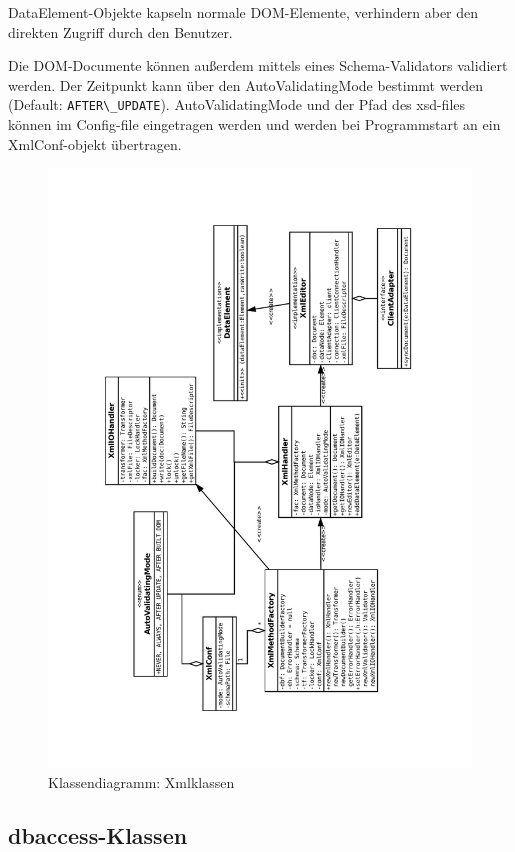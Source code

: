 DataElement-Objekte kapseln normale DOM-Elemente, verhindern aber den 
direkten Zugriff durch den Benutzer.

Die DOM-Documente können außerdem mittels eines Schema-Validators validiert werden. 
Der Zeitpunkt kann über den AutoValidatingMode bestimmt werden (Default: \lstinline{AFTER\_UPDATE}).
AutoValidatingMode und der Pfad des xsd-files können im Config-file eingetragen werden
und werden bei Programmstart an ein XmlConf-objekt übertragen.


\liable{\cii}
\begin{figure}[H]
	\label{dia:design:frontend:classes:xml}
	\includegraphics[angle=270, width=1.2\textwidth]{design/frontend/classes/xml.pdf}
	\caption{Klassendiagramm: Xmlklassen}
\end{figure}
\subsection{dbaccess-Klassen}
\liable{\cii}

